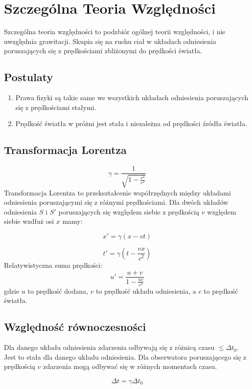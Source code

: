 \documentclass{../notatki}
\begin{document}
\section{Szczególna Teoria Względności}

Szczególna teoria względności to podzbiór ogólnej teorii względności, i nie
uwzględnia grawitacji. Skupia się na ruchu ciał w układach odniesienia
poruszających się z prędkościami zbliżonymi do prędkości światła.

\subsection{Postulaty}

\begin{enumerate}
  \item Prawa fizyki są takie same we wszystkich układach odniesienia
    poruszających się z prędkościami stałymi.
  \item Prędkość światła w próżni jest stała i niezależna od prędkości
    źródła światła.
\end{enumerate}

\subsection{Transformacja Lorentza}

$$
\gamma = \frac{1}{\sqrt{1 - \frac{v^2}{c^2}}}
$$
Transformacja Lorentza to przekształcenie współrzędnych między układami
odniesienia poruszającymi się z różnymi prędkościami. Dla dwóch układów
odniesienia $S$ i $S'$ poruszających się względem siebie z prędkością $v$
względem siebie wzdłuż osi $x$ mamy:

$$
x' = \gamma(x - vt)
$$

$$
t' = \gamma(t - \frac{vx}{c^2})
$$
Relatywistyczna suma prędkości:
$$
u' = \frac{u + v}{1 - \frac{uv}{c^2}}
$$
gdzie $u$ to prędkość dodana, $v$ to prędkość układu odniesienia, a $c$ to
prędkość światła.

\subsection{Względność równoczesności}

Dla danego układu odniesienia zdarzenia odbywają się z różnicą czasu
$\le \Delta t_0$. Jest to stała dla danego układu odniesienia.
Dla obserwatora poruszającego się z prędkością $v$ zdarzenia
mogą odbywać się w różnych momentach czasu.

$$
\Delta t = \gamma \Delta t_0
$$
\end{document}
